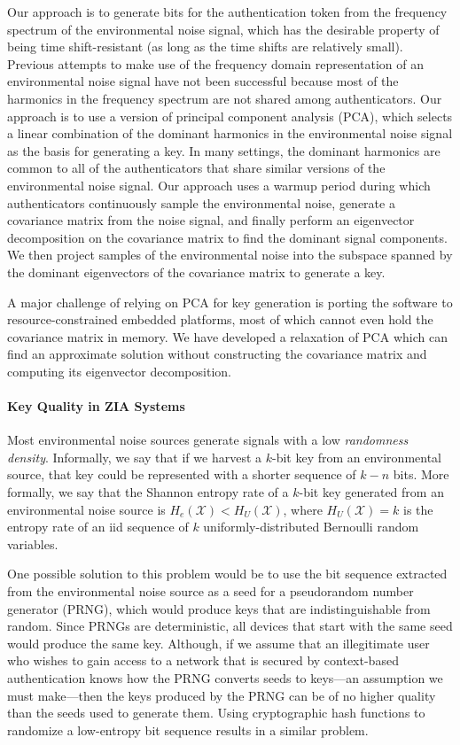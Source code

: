 \documentclass[10pt,onecolumn]{article}
\begin{document}
Our approach is to generate bits for the authentication token from the frequency spectrum of the environmental noise signal, which has the desirable property of being time shift-resistant (as long as the time shifts are relatively small).
Previous attempts to make use of the frequency domain representation of an environmental noise signal have not been successful because most of the harmonics in the frequency spectrum are not shared among authenticators.
Our approach is to use a version of principal component analysis (PCA), which selects a linear combination of the dominant harmonics in the environmental noise signal as the basis for generating a key.
In many settings, the dominant harmonics are common to all of the authenticators that share similar versions of the environmental noise signal.
Our approach uses a warmup period during which authenticators continuously sample the environmental noise, generate a covariance matrix from the noise signal, and finally perform an eigenvector decomposition on the covariance matrix to find the dominant signal components.
We then project samples of the environmental noise into the subspace spanned by the dominant eigenvectors of the covariance matrix to generate a key.

A major challenge of relying on PCA for key generation is porting the software to resource-constrained embedded platforms, most of which cannot even hold the covariance matrix in memory.
We have developed a relaxation of PCA which can find an approximate solution without constructing the covariance matrix and computing its eigenvector decomposition.




\paragraph{Key Quality in ZIA Systems}



Most environmental noise sources generate signals with a low \emph{randomness density}.
Informally, we say that if we harvest a $k$-bit key from an environmental source, that key could be represented with a shorter sequence of $k-n$ bits.
More formally, we say that the Shannon entropy rate of a $k$-bit key generated from an environmental noise source is $H_e(\mathcal{X}) < H_U(\mathcal{X})$, where $H_U(\mathcal{X}) = k$ is the entropy rate of an iid sequence of $k$ uniformly-distributed Bernoulli random variables.


One possible solution to this problem would be to use the bit sequence extracted from the environmental noise source as a seed for a pseudorandom number generator (PRNG), which would produce keys that are indistinguishable from random.
Since PRNGs are deterministic, all devices that start with the same seed would produce the same key.
Although, if we assume that an illegitimate user who wishes to gain access to a network that is secured by context-based authentication knows how the PRNG converts seeds to keys---an assumption we must make---then the keys produced by the PRNG can be of no higher quality than the seeds used to generate them.
Using cryptographic hash functions to randomize a low-entropy bit sequence results in a similar problem.
\end{document}

